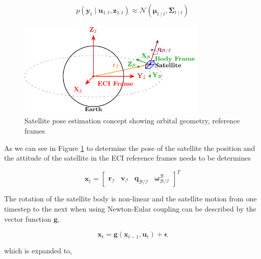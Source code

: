 \begin{equation}
    p(\mathbf{y}_t \mid \mathbf{u}_{1:t}, \mathbf{z}_{1:t}) \approx \mathcal{N}(\boldsymbol{\mu}_{t \mid t}, \boldsymbol{\Sigma}_{t \mid t})
\end{equation}



\label{sec:statesystemmodel}

\begin{figure}[htbp]
    \centering
    \includegraphics[width=0.8\textwidth]{figures/Figure1.pdf}
    \caption{Satellite pose estimation concept showing orbital geometry, reference frames}
    \label{fig:System Modelling}
\end{figure}

As we can see in Figure \ref{fig:System Modelling} to determine the pose of the satellite the position and the attitude of the satellite in the ECI reference frames needs to be
determines

\begin{equation}
    \mathbf{x}_t =
    \begin{bmatrix}
        \mathbf{r}_\mathcal{I} & \mathbf{v}_\mathcal{I} & \mathbf{q}_\mathcal{B/I} & \boldsymbol{\omega}_\mathcal{B/I}^\mathcal{B}
    \end{bmatrix}
    ^T
\end{equation}

\label{sec:statemotionmodel}

The rotation of the satellite body is non-linear and the satellite motion from one timestep to the next when using Newton-Eular coupling can be described by the vector function
$\mathbf{g}$,

\begin{equation}
    \mathbf{x}_t = \mathbf{g}(\mathbf{x}_{t-1},\mathbf{u}_t) + \boldsymbol{\epsilon}
\end{equation}

which is expanded to,

